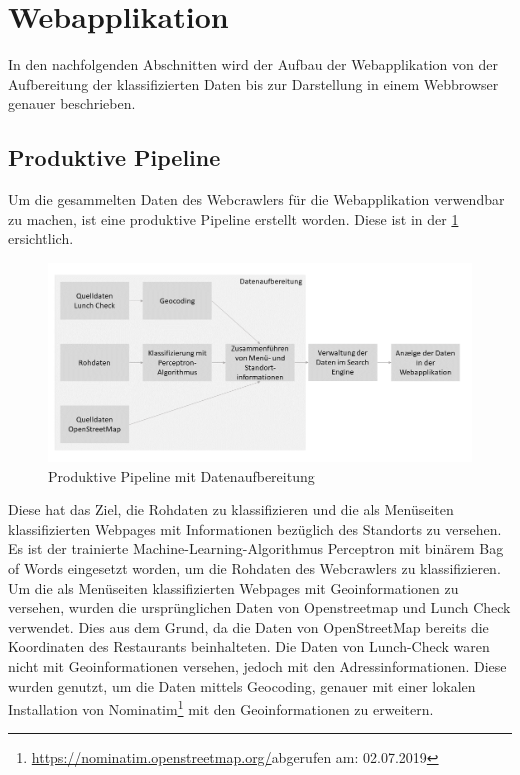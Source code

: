 \section{Webapplikation}
In den nachfolgenden Abschnitten wird der Aufbau der Webapplikation von der Aufbereitung der klassifizierten Daten bis zur Darstellung in einem Webbrowser genauer beschrieben.
\subsection{Produktive Pipeline}
\FloatBarrier
Um die gesammelten Daten des Webcrawlers für die Webapplikation verwendbar zu machen, ist eine produktive Pipeline erstellt worden.
Diese ist in der \cref{fig:prod_pipeline} ersichtlich.
\begin{figure}[H]
	\centering	
	\includegraphics[width=1\columnwidth,keepaspectratio]{img/Ablauf_prod_pipeline.png}
	\caption{Produktive Pipeline mit Datenaufbereitung}
	\label{fig:prod_pipeline}
\end{figure}
Diese hat das Ziel, die Rohdaten zu klassifizieren und die als Menüseiten klassifizierten Webpages mit Informationen bezüglich des Standorts zu versehen.
Es ist der trainierte Machine-Learning-Algorithmus \glqq Perceptron mit binärem Bag of Words\grqq{} eingesetzt worden, um die Rohdaten des Webcrawlers zu klassifizieren.
Um die als Menüseiten klassifizierten Webpages mit Geoinformationen zu versehen, wurden die ursprünglichen Daten von Openstreetmap und Lunch Check verwendet. Dies aus dem Grund, da die Daten von OpenStreetMap bereits die Koordinaten des Restaurants beinhalteten.
Die Daten von Lunch-Check waren nicht mit Geoinformationen versehen, jedoch mit den Adressinformationen.
Diese wurden genutzt, um  die Daten mittels Geocoding, genauer mit einer lokalen Installation von Nominatim\footnote{\url{https://nominatim.openstreetmap.org/}abgerufen am: 02.07.2019} mit den Geoinformationen zu erweitern.
